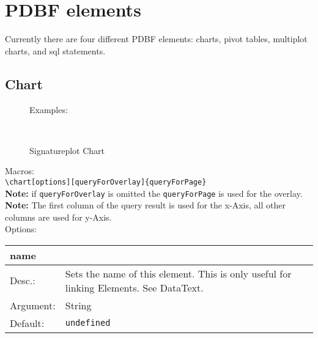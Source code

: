 \documentclass[11pt]{article}
\def\a{5cm}
\def\b{10.5cm}
\def\option#1#2#3#4{%
\noindent \begin{tabular}{|p{\a}|p{\b}|}
\hline
\textbf{#1} & \\
\hline
Desc.: & #2 \\
\hline
Argument: & #3\\
\hline
Default:& #4\\
\hline
\end{tabular} \\[4pt]%
}
\begin{document}
\newpage
\section{PDBF elements}
Currently there are four different PDBF elements: charts, pivot tables, multiplot charts, and sql statements.

\subsection{Chart}
\begin{figure}[h!]%
\hspace{-218pt}Examples:\\
    \centering
    \begin{minipage}{.48\textwidth}
    \caption{Line Chart}
    \end{minipage}
    \hspace{11pt}
    \begin{minipage}{.48\textwidth}
    \caption{Bar Chart}
    \end{minipage} \\[8pt]
    
    \begin{minipage}{1.0\textwidth}
    \caption{Signatureplot Chart}
    \end{minipage}
\end{figure}

\noindent Macros: \\[3pt]
\verb|\chart[options][queryForOverlay]{queryForPage}| \\
\textbf{Note:} if \verb|queryForOverlay| is omitted the \verb|queryForPage| is used for the overlay.\\
\textbf{Note:} The first column of the query result is used for the x-Axis, all other columns are used for y-Axis.\\[8pt] 
\noindent Options:\\[3pt]
%
\option
{name}
{Sets the name of this element. This is only useful for linking Elements. See DataText.}
{String}
{\texttt{undefined}}
\end{document}
